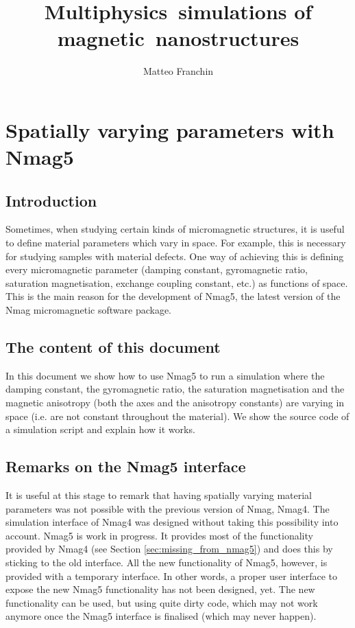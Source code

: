 \documentclass[11pt,oneside,openany]{article}
\author{Matteo Franchin}
\title{Multiphysics~simulations of magnetic~nanostructures}
\begin{document}
\titlepage

\section{Spatially varying parameters with Nmag5}

\subsection{Introduction}
Sometimes, when studying certain kinds of micromagnetic structures, it is
useful to define material parameters which vary in space. For example, this is
necessary for studying samples with material defects. One way of achieving this
is defining every micromagnetic parameter (damping constant, gyromagnetic
ratio, saturation magnetisation, exchange coupling constant, etc.)  as
functions of space. This is the main reason for the development of Nmag5,
the latest version of the Nmag micromagnetic software package.

\subsection{The content of this document}
In this document we show how to use Nmag5 to run a simulation where
the damping constant, the gyromagnetic ratio, the saturation magnetisation
and the magnetic anisotropy (both the axes and the anisotropy constants)
are varying in space (i.e. are not constant throughout the material).
We show the source code of a simulation script and explain how it works.

\subsection{Remarks on the Nmag5 interface}
It is useful at this stage to remark that having spatially varying material
parameters was not possible with the previous version of Nmag, Nmag4. The
simulation interface of Nmag4 was designed without taking this possibility into
account. Nmag5 is work in progress. It provides most of the functionality
provided by Nmag4 (see Section \ref{sec:missing_from_nmag5}) and does this by
sticking to the old interface. All the new functionality of Nmag5, however, is
provided with a temporary interface. In other words, a proper user interface to
expose the new Nmag5 functionality has not been designed, yet.  The new
functionality can be used, but using quite dirty code, which may not work
anymore once the Nmag5 interface is finalised (which may never happen).
\end{document}
